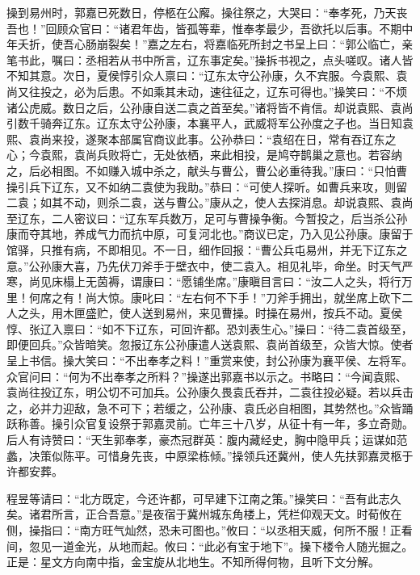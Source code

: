 操到易州时，郭嘉已死数日，停柩在公廨。操往祭之，大哭曰：“奉孝死，乃天丧吾也！”回顾众官曰：“诸君年齿，皆孤等辈，惟奉孝最少，吾欲托以后事。不期中年夭折，使吾心肠崩裂矣！”嘉之左右，将嘉临死所封之书呈上曰：“郭公临亡，亲笔书此，嘱曰：丞相若从书中所言，辽东事定矣。”操拆书视之，点头嗟叹。诸人皆不知其意。次日，夏侯惇引众人禀曰：“辽东太守公孙康，久不宾服。今袁熙、袁尚又往投之，必为后患。不如乘其未动，速往征之，辽东可得也。”操笑曰：“不烦诸公虎威。数日之后，公孙康自送二袁之首至矣。”诸将皆不肯信。却说袁熙、袁尚引数千骑奔辽东。辽东太守公孙康，本襄平人，武威将军公孙度之子也。当日知袁熙、袁尚来投，遂聚本部属官商议此事。公孙恭曰：“袁绍在日，常有吞辽东之心；今袁熙，袁尚兵败将亡，无处依栖，来此相投，是鸠夺鹊巢之意也。若容纳之，后必相图。不如赚入城中杀之，献头与曹公，曹公必重待我。”康曰：“只怕曹操引兵下辽东，又不如纳二袁使为我助。”恭曰：“可使人探听。如曹兵来攻，则留二袁；如其不动，则杀二袁，送与曹公。”康从之，使人去探消息。却说袁熙、袁尚至辽东，二人密议曰：“辽东军兵数万，足可与曹操争衡。今暂投之，后当杀公孙康而夺其地，养成气力而抗中原，可复河北也。”商议已定，乃入见公孙康。康留于馆驿，只推有病，不即相见。不一日，细作回报：“曹公兵屯易州，并无下辽东之意。”公孙康大喜，乃先伏刀斧手于壁衣中，使二袁入。相见礼毕，命坐。时天气严寒，尚见床榻上无茵褥，谓康曰：“愿铺坐席。”康瞋目言曰：“汝二人之头，将行万里！何席之有！尚大惊。康叱曰：“左右何不下手！”刀斧手拥出，就坐席上砍下二人之头，用木匣盛贮，使人送到易州，来见曹操。时操在易州，按兵不动。夏侯惇、张辽入禀曰：“如不下辽东，可回许都。恐刘表生心。”操曰：“待二袁首级至，即便回兵。”众皆暗笑。忽报辽东公孙康遣人送袁熙、袁尚首级至，众皆大惊。使者呈上书信。操大笑曰：“不出奉孝之料！”重赏来使，封公孙康为襄平侯、左将军。众官问曰：“何为不出奉孝之所料？”操遂出郭嘉书以示之。书略曰：“今闻袁熙、袁尚往投辽东，明公切不可加兵。公孙康久畏袁氏吞并，二袁往投必疑。若以兵击之，必并力迎敌，急不可下；若缓之，公孙康、袁氏必自相图，其势然也。”众皆踊跃称善。操引众官复设祭于郭嘉灵前。亡年三十八岁，从征十有一年，多立奇勋。后人有诗赞曰：“天生郭奉孝，豪杰冠群英：腹内藏经史，胸中隐甲兵；运谋如范蠡，决策似陈平。可惜身先丧，中原梁栋倾。”操领兵还冀州，使人先扶郭嘉灵柩于许都安葬。

程昱等请曰：“北方既定，今还许都，可早建下江南之策。”操笑曰：“吾有此志久矣。诸君所言，正合吾意。”是夜宿于冀州城东角楼上，凭栏仰观天文。时荀攸在侧，操指曰：“南方旺气灿然，恐未可图也。”攸曰：“以丞相天威，何所不服！正看间，忽见一道金光，从地而起。攸曰：“此必有宝于地下”。操下楼令人随光掘之。正是：星文方向南中指，金宝旋从北地生。不知所得何物，且听下文分解。